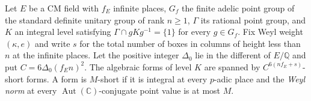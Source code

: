 \begin{lemma}
\label{lem:a-free-level-short-forms}
\emitthmsource
Let $E$ be a CM field with $f_E$ infinite places, $G_f$ the finite adelic point group of the standard definite unitary group of rank $n\ge1$, $\Gamma$ its rational point group, and $K$ an integral level satisfying $\Gamma\cap gKg^{-1}=\{1\}$ for every $g\in G_f$. Fix Weyl weight $(\kappa,e)$ and write $s$ for the total number of boxes in columns of height less than $n$ at the infinite places. Let the positive integer $\Delta_0$ lie in the different of $E/\mathbb Q$ and put $C=6\Delta_0(f_E n)^2$. The algebraic forms of level $K$ are spanned by $C^{6(nf_E+s)}$-short forms. A form is $M$-short if it is integral at every $p$-adic place and the \emph{Weyl norm} at every $\operatorname{Aut}(\mathbb C)$-conjugate point value is at most $M$.
\end{lemma}

